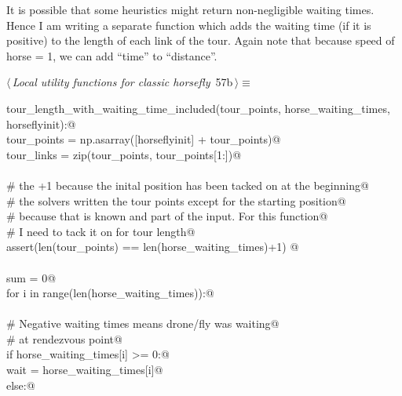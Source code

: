 \documentclass[11.5pt]{report}
\begin{document}
\vspace{-0.8cm}\newchunk It is possible that some heuristics might return non-negligible
      waiting times. Hence I am writing a separate function which
      adds the waiting time (if it is positive) to the length of 
      each link of the tour. Again note that because 
      speed of horse = 1, we can add ``time'' to ``distance''. 

\begin{flushleft} \small\label{scrap82}\raggedright\small
{} $\langle\,${\itshape Local utility functions for classic horsefly}\nobreak\ {\footnotesize {57b}}$\,\rangle\equiv$
\vspace{-1ex}
\begin{list}{}{} \item
\mbox{}\verb@def tour_length_with_waiting_time_included(tour_points, horse_waiting_times, horseflyinit):@\\
\mbox{}\verb@      tour_points   = np.asarray([horseflyinit] + tour_points)@\\
\mbox{}\verb@      tour_links    = zip(tour_points, tour_points[1:])@\\
\mbox{}\verb@@\\
\mbox{}\verb@      # the +1 because the inital position has been tacked on at the beginning@\\
\mbox{}\verb@      # the solvers written the tour points except for the starting position@\\
\mbox{}\verb@      # because that is known and part of the input. For this function@\\
\mbox{}\verb@      # I need to tack it on for tour length@\\
\mbox{}\verb@      assert(len(tour_points) == len(horse_waiting_times)+1) @\\
\mbox{}\verb@@\\
\mbox{}\verb@      sum = 0@\\
\mbox{}\verb@      for i in range(len(horse_waiting_times)):@\\
\mbox{}\verb@@\\
\mbox{}\verb@          # Negative waiting times means drone/fly was waiting@\\
\mbox{}\verb@          # at rendezvous point@\\
\mbox{}\verb@          if horse_waiting_times[i] >= 0:@\\
\mbox{}\verb@              wait = horse_waiting_times[i]@\\
\mbox{}\verb@          else:@\\

\end{list}
\end{flushleft}
\end{document}
